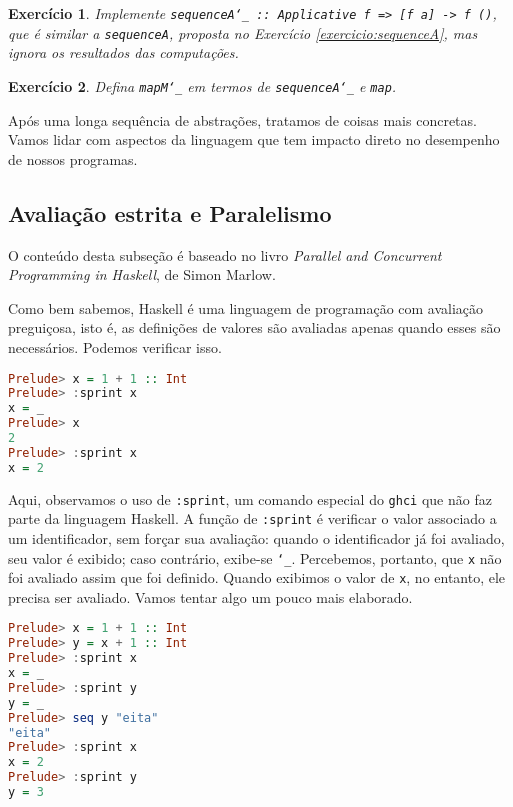 \documentclass[a4paper]{article}
\newtheorem{exercicio}{Exercício}
\begin{document}
\begin{exercicio}
	Implemente \emph{\texttt{sequenceA\char`_ \quad:: Applicative f => [f a] -> f ()}}, que é similar a \emph{\texttt{sequenceA}}, proposta no Exercício \ref{exercicio:sequenceA}, mas ignora os resultados das computações.
\end{exercicio}

\begin{exercicio}
	Defina \emph{\texttt{mapM\char`_}} em termos de \emph{\texttt{sequenceA\char`_}} e \emph{\texttt{map}}.
\end{exercicio}

Após uma longa sequência de abstrações, tratamos de coisas mais concretas.
Vamos lidar com aspectos da linguagem que tem impacto direto no desempenho de nossos programas.

\subsection{Avaliação estrita e Paralelismo}

\epigraph{O conteúdo desta subseção é baseado no livro \emph{Parallel and Concurrent Programming in Haskell}, de Simon Marlow.}{}

Como bem sabemos, Haskell é uma linguagem de programação com avaliação preguiçosa, isto é, as definições de valores são avaliadas apenas quando esses são necessários.
Podemos verificar isso.

\begin{lstlisting}[language=haskell, frame=single]
Prelude> x = 1 + 1 :: Int
Prelude> :sprint x
x = _
Prelude> x
2
Prelude> :sprint x
x = 2
\end{lstlisting}

Aqui, observamos o uso de \texttt{:sprint}, um comando especial do \texttt{ghci} que não faz parte da linguagem Haskell.
A função de \texttt{:sprint} é verificar o valor associado a um identificador, sem forçar sua avaliação: quando o identificador já foi avaliado, seu valor é exibido; caso contrário, exibe-se \texttt{\char`_}.
Percebemos, portanto, que \texttt{x} não foi avaliado assim que foi definido.
Quando exibimos o valor de \texttt{x}, no entanto, ele precisa ser avaliado.
Vamos tentar algo um pouco mais elaborado.

\begin{lstlisting}[language=haskell, frame=single]
Prelude> x = 1 + 1 :: Int
Prelude> y = x + 1 :: Int
Prelude> :sprint x
x = _
Prelude> :sprint y
y = _
Prelude> seq y "eita"
"eita"
Prelude> :sprint x
x = 2
Prelude> :sprint y
y = 3
\end{lstlisting}
\end{document}
